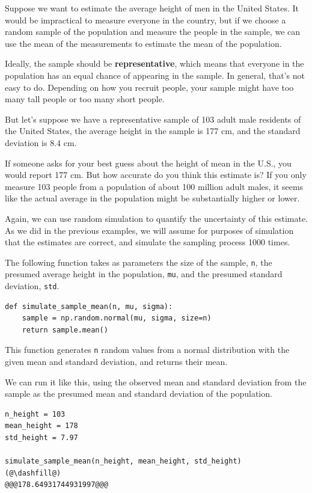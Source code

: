 Suppose we want to estimate the average height of men in the United
States. It would be impractical to measure everyone in the country, but
if we choose a random sample of the population and measure the people in
the sample, we can use the mean of the measurements to estimate the mean
of the population.

Ideally, the sample should be \textbf{representative}, which means that
everyone in the population has an equal chance of appearing in the
sample. In general, that's not easy to do. Depending on how you recruit
people, your sample might have too many tall people or too many short
people.

But let's suppose we have a representative sample of 103 adult male
residents of the United States, the average height in the sample is 177
cm, and the standard deviation is 8.4 cm.

If someone asks for your best guess about the height of mean in the
U.S., you would report 177 cm. But how accurate do you think this
estimate is? If you only measure 103 people from a population of about
100 million adult males, it seems like the actual average in the
population might be substantially higher or lower.

Again, we can use random simulation to quantify the uncertainty of this
estimate. As we did in the previous examples, we will assume for
purposes of simulation that the estimates are correct, and simulate the
sampling process 1000 times.

The following function takes as parameters the size of the sample,
\passthrough{\lstinline!n!}, the presumed average height in the
population, \passthrough{\lstinline!mu!}, and the presumed standard
deviation, \passthrough{\lstinline!std!}.

\begin{lstlisting}[]
def simulate_sample_mean(n, mu, sigma):
    sample = np.random.normal(mu, sigma, size=n)
    return sample.mean()
\end{lstlisting}

This function generates \passthrough{\lstinline!n!} random values from a
normal distribution with the given mean and standard deviation, and
returns their mean.

We can run it like this, using the observed mean and standard deviation
from the sample as the presumed mean and standard deviation of the
population.

\begin{lstlisting}[]
n_height = 103
mean_height = 178
std_height = 7.97

simulate_sample_mean(n_height, mean_height, std_height)
(@\dashfill@)
@@@178.64931744931997@@@
\end{lstlisting}

